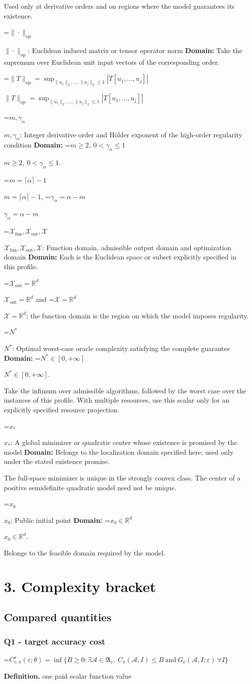 \documentclass[10pt,a4paper]{article}
\newcommand{\AtlasMath}[1]{\par\begingroup\centering\setbox0=\hbox{$\displaystyle #1$}\ifdim\wd0>1.4\linewidth\typeout{ATLAS WIDE FORMULA: \the\wd0}\fi\ifdim\wd0>\linewidth\resizebox{\linewidth}{!}{\box0}\else\box0\fi\par\endgroup}
\newcommand{\AtlasInlineMath}[1]{\begingroup\setbox0=\hbox{$#1$}\ifdim\wd0>.4\linewidth\endgroup\AtlasMath{#1}\else\endgroup$#1$\fi}
\begin{document}
Used only at derivative orders and on regions where the model guarantees its existence.

\AtlasInlineMath{\|\cdot\|_{\mathrm{op}}}: Euclidean induced matrix or tensor operator norm \textbf{Domain:} Take the supremum over Euclidean unit input vectors of the corresponding order.

\AtlasInlineMath{\|T\|_{\mathrm{op}}=\sup_{\|u_1\|_2,\ldots,\|u_j\|_2\le1}|T[u_1,\ldots,u_j]|}

\AtlasInlineMath{m,\gamma_\alpha}: Integer derivative order and Hölder exponent of the high-order regularity condition \textbf{Domain:} \AtlasInlineMath{m\ge2,\ 0<\gamma_\alpha\le1}.

\AtlasInlineMath{m=\lceil\alpha\rceil-1}, \AtlasInlineMath{\gamma_\alpha=\alpha-m}

\AtlasInlineMath{\mathcal{X}_{\mathrm{fun}},\mathcal{X}_{\mathrm{out}},\mathcal{X}}: Function domain, admissible output domain and optimization domain \textbf{Domain:} Each is the Euclidean space or subset explicitly specified in this profile.

\AtlasInlineMath{\mathcal{X}_{\mathrm{out}}=\mathbb{R}^d} and \AtlasInlineMath{\mathcal{X}=\mathbb{R}^d}; the function domain is the region on which the model imposes regularity.

\AtlasInlineMath{N^*}: Optimal worst-case oracle complexity satisfying the complete guarantee \textbf{Domain:} \AtlasInlineMath{N^*\in[0,+\infty]}.

Take the infimum over admissible algorithms, followed by the worst case over the instances of this profile. With multiple resources, use this scalar only for an explicitly specified resource projection.

\AtlasInlineMath{x_*}: A global minimizer or quadratic center whose existence is promised by the model \textbf{Domain:} Belongs to the localization domain specified here; used only under the stated existence promise.

The full-space minimizer is unique in the strongly convex class. The center of a positive semidefinite quadratic model need not be unique.

\AtlasInlineMath{x_0}: Public initial point \textbf{Domain:} \AtlasInlineMath{x_0\in\mathbb{R}^d}.

Belongs to the feasible domain required by the model.

\section{3. Complexity bracket}
\subsection{Compared quantities}
\subsubsection{Q1 - target accuracy cost}
\AtlasMath{C^\star_{v,\pi}(\varepsilon;\theta)=\inf\{B\ge0:\exists\mathcal A\in\mathfrak A_v,\ C_\pi(\mathcal A,I)\le B\ \text{and}\ G_v(\mathcal A,I;\varepsilon)\ \forall I\}}
\textbf{Definition.} one paid scalar function value
\end{document}
